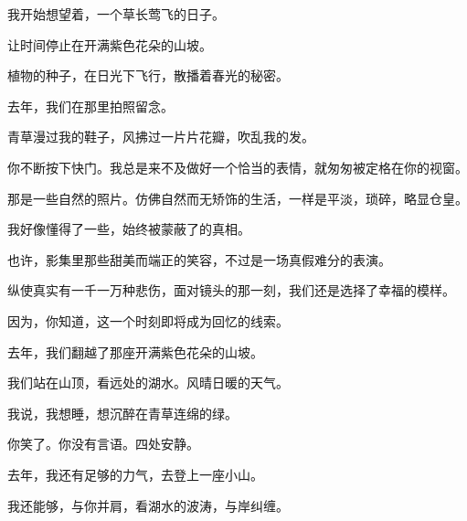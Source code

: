		\vspace{1em}
		我开始想望着，一个草长莺飞的日子。\par
		让时间停止在开满紫色花朵的山坡。\par
		植物的种子，在日光下飞行，散播着春光的秘密。\par
		去年，我们在那里拍照留念。\par
		青草漫过我的鞋子，风拂过一片片花瓣，吹乱我的发。\par
		你不断按下快门。我总是来不及做好一个恰当的表情，就匆匆被定格在你的视窗。\par
		那是一些自然的照片。仿佛自然而无矫饰的生活，一样是平淡，琐碎，略显仓皇。\par
		我好像懂得了一些，始终被蒙蔽了的真相。\par
		也许，影集里那些甜美而端正的笑容，不过是一场真假难分的表演。\par
		纵使真实有一千一万种悲伤，面对镜头的那一刻，我们还是选择了幸福的模样。\par
		因为，你知道，这一个时刻即将成为回忆的线索。\par
		去年，我们翻越了那座开满紫色花朵的山坡。\par
		我们站在山顶，看远处的湖水。风晴日暖的天气。\par
		我说，我想睡，想沉醉在青草连绵的绿。\par
		你笑了。你没有言语。四处安静。

		\vspace{1em}
		去年，我还有足够的力气，去登上一座小山。\par
		我还能够，与你并肩，看湖水的波涛，与岸纠缠。

